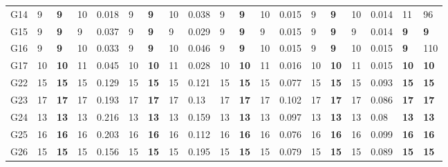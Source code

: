 \documentclass[12pt, a4paper]{article}%
\numberwithin{equation}{section}
\theoremstyle{plain}
\begin{document}
{\begin{landscape}
\begin{longtable}{lllllllllllllllllll}
						G14                                           & 9    & \textbf{9}  & 10  & 0.018 & 9    & \textbf{9}  & 10  & 0.038 & 9    & \textbf{9}  & 10  & 0.015 & 9    & \textbf{9}  & 10  & 0.014 & 11                                          & 96                                       \\
						G15                                           & 9    & \textbf{9}  & 9   & 0.037 & 9    & \textbf{9}  & 9   & 0.029 & 9    & \textbf{9}  & 9   & 0.015 & 9    & \textbf{9}  & 9   & 0.014 & \textbf{9}                                  & \textbf{9}                               \\
						G16                                           & 9    & \textbf{9}  & 10  & 0.033 & 9    & \textbf{9}  & 10  & 0.046 & 9    & \textbf{9}  & 10  & 0.015 & 9    & \textbf{9}  & 10  & 0.015 & \textbf{9}                                  & 110                                      \\
						G17                                           & 10   & \textbf{10} & 11  & 0.045 & 10   & \textbf{10} & 11  & 0.028 & 10   & \textbf{10} & 11  & 0.016 & 10   & \textbf{10} & 11  & 0.015 & \textbf{10}                                 & \textbf{10}                              \\
						G22                                           & 15   & \textbf{15} & 15  & 0.129 & 15   & \textbf{15} & 15  & 0.121 & 15   & \textbf{15} & 15  & 0.077 & 15   & \textbf{15} & 15  & 0.093 & \textbf{15}                                 & \textbf{15}                              \\
						G23                                           & 17   & \textbf{17} & 17  & 0.193 & 17   & \textbf{17} & 17  & 0.13  & 17   & \textbf{17} & 17  & 0.102 & 17   & \textbf{17} & 17  & 0.086 & \textbf{17}                                 & \textbf{17}                              \\
						G24                                           & 13   & \textbf{13} & 13  & 0.216 & 13   & \textbf{13} & 13  & 0.159 & 13   & \textbf{13} & 13  & 0.097 & 13   & \textbf{13} & 13  & 0.08  & \textbf{13}                                 & \textbf{13}                              \\
						G25                                           & 16   & \textbf{16} & 16  & 0.203 & 16   & \textbf{16} & 16  & 0.112 & 16   & \textbf{16} & 16  & 0.076 & 16   & \textbf{16} & 16  & 0.099 & \textbf{16}                                 & \textbf{16}                              \\
						G26                                           & 15   & \textbf{15} & 15  & 0.156 & 15   & \textbf{15} & 15  & 0.195 & 15   & \textbf{15} & 15  & 0.079 & 15   & \textbf{15} & 15  & 0.089 & \textbf{15}                                 & \textbf{15}                              \\

\end{longtable}
\end{landscape}}
\end{document}
